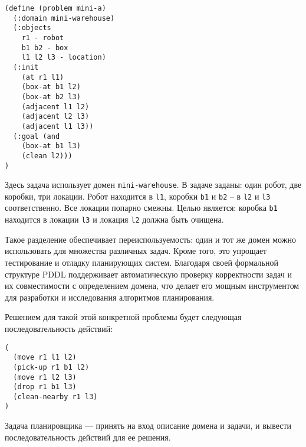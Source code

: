 \begin{enumerate}
  \begin{verbatim}
(define (problem mini-a)
  (:domain mini-warehouse)
  (:objects
    r1 - robot
    b1 b2 - box
    l1 l2 l3 - location)
  (:init
    (at r1 l1)
    (box-at b1 l2)
    (box-at b2 l3)
    (adjacent l1 l2)
    (adjacent l2 l3)
    (adjacent l1 l3))
  (:goal (and
    (box-at b1 l3)
    (clean l2)))
)
  \end{verbatim}

  Здесь задача использует домен \texttt{mini-warehouse}. 
  В задаче заданы: один робот, две коробки, три локации.
  Робот находится в \texttt{l1}, коробки \texttt{b1} и \texttt{b2} -- в \texttt{l2} и \texttt{l3} соответственно.
  Все локации попарно смежны.
  Целью является: коробка \texttt{b1} находится в локации \texttt{l3} и локация \texttt{l2} должна быть очищена.
\end{enumerate}

Такое разделение обеспечивает переиспользуемость:
один и тот же домен можно использовать для множества различных задач.
Кроме того, это упрощает тестирование и отладку планирующих систем.
Благодаря своей формальной структуре PDDL поддерживает автоматическую проверку корректности задач
и их совместимости с определением домена,
что делает его мощным инструментом для разработки и исследования алгоритмов планирования.

Решением для такой этой конкретной проблемы будет следующая последовательность действий:
\begin{verbatim}
(
  (move r1 l1 l2)
  (pick-up r1 b1 l2)
  (move r1 l2 l3)
  (drop r1 b1 l3)
  (clean-nearby r1 l3)
)
\end{verbatim}

Задача планировщика --- принять на вход описание домена и задачи, и вывести последовательность действий для ее решения.
